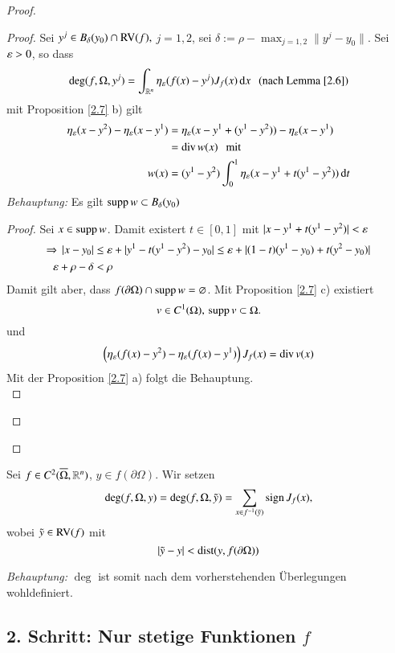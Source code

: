 \begin{proof}
\begin{description}
    \begin{proof}
        Sei $y^j\in B_\delta (y_0)\cap \mathrm{RV}(f),$ $j=1,2$, sei $\delta := \rho-\max_{j=1,2}\|y^j-y_0\|$.
        Sei $\varepsilon>0$, so dass
        \[
            \deg(f,\Omega,y^j)=\int_{\mathbb{R}^n} \eta_\varepsilon(f(x)-y^j)J_f(x) \, \mathrm{d} x \hspace{.25cm} 
            \text{(nach Lemma $\ref{2.6}$)}
        \]
        mit Proposition \ref{2.7} b) gilt
        \begin{align*}
            \eta_\varepsilon(x-y^2)-\eta_\varepsilon(x-y^1)&= \eta_\varepsilon (x-y^1+(y^1-y^2))-\eta_\varepsilon(x-y^1)\\
            &= \mathrm{div}\, w(x) \hspace{.25cm}\text{mit}\\
            w(x)&= (y^1-y^2)\int_0^1 \eta_\varepsilon (x-y^1+t(y^1-y^2))\, \mathrm{d} t
        \end{align*}
    \textit{Behauptung:} Es gilt $\mathrm{supp}\, w\subset B_\delta(y_0)$
    \begin{proof}
        Sei $x\in \mathrm{supp}\, w$. Damit existert $t\in [0,1]$ mit $|x-y^1+t(y^1-y^2)|<\varepsilon$
        \begin{align*}
            \Rightarrow \, |x-y_0|&\leq \varepsilon + |y^1-t(y^1-y^2)-y_0|\leq \varepsilon +|(1-t)(y^1-y_0)+t(y^2-y_0)|\\
                \varepsilon + \rho-\delta&<\rho
        \end{align*}
        Damit gilt aber, dass $f(\partial \Omega)\cap \mathrm{supp}\, w=\varnothing$. Mit Proposition 
        \ref{2.7} c) existiert
        \[
            v\in C^1(\Omega),\, \mathrm{supp}\, v \subset \Omega.
        \]
        und
        \[
            \left( \eta_\varepsilon(f(x)-y^2)-\eta_\varepsilon (f(x)-y^1) \right)J_f(x)=\mathrm{div}\, v(x)
        \]
        Mit der Proposition \ref{2.7} a) folgt die Behauptung. \[  \]
    \end{proof}
    \[  \]
    \end{proof}
    \end{description}
\end{proof}

\begin{defi}\label{2.9}
    Sei $f\in C^2(\overline \Omega,\mathbb{R}^n)$, $y\in f(\partial \Omega)$. Wir setzen
    \[
        \deg (f,\Omega,y)= \deg(f,\Omega,\tilde y)=\sum_{x\in f^{-1}(\tilde y)} \mathrm{sign}\, J_f(x),
    \]
    wobei $\tilde y \in \mathrm{RV}(f)$ mit
    \[
        |\tilde y- y| < \mathrm{dist}(y,f(\partial \Omega))
    \]
\end{defi}

\noindent\textit{Behauptung:} $\deg$ ist somit nach dem vorherstehenden Überlegungen wohldefiniert.

\subsection*{2. Schritt: Nur stetige Funktionen $f$}

